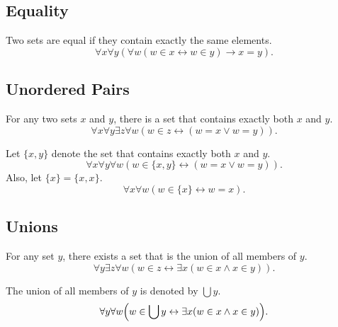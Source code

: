 \documentclass[11pt]{article}
\begin{document}
\subsection{Equality}
\begin{axiom}[Extensionality]
  Two sets are equal if they contain exactly the same elements.
  \begin{equation*}
    \forall x \forall y (\forall w (w \in x \leftrightarrow w \in y) \rightarrow x = y). 
  \end{equation*}
\end{axiom}

\subsection{Unordered Pairs}
\begin{axiom}[Pairing]
  For any two sets $x$ and $y$, there is a set that contains exactly both $x$ and $y$.
  \begin{equation*}
    \forall x \forall y \exists z \forall w (w \in z \leftrightarrow (w = x \vee w = y)).
  \end{equation*}
\end{axiom}

\begin{definition}
  Let $\{x, y\}$ denote the set that contains exactly both $x$ and $y$.
  \begin{equation*}
    \forall x \forall y \forall w (w \in \{x, y\} \leftrightarrow (w = x \vee w = y)).
  \end{equation*}
  Also, let $\{x\} = \{x, x\}$.
  \begin{equation*}
    \forall x \forall w (w \in \{x\} \leftrightarrow w = x).
  \end{equation*}
\end{definition}

\subsection{Unions}
\begin{axiom}[Union]
  For any set $y$, there exists a set that is the union of all members of $y$.
  \begin{equation*}
    \forall y \exists z \forall w (w \in z \leftrightarrow \exists x (w \in x \wedge x \in y)).
  \end{equation*}
\end{axiom}

\begin{definition}
  The union of all members of $y$ is denoted by $\bigcup y$.
  \begin{equation*}
    \forall y \forall w \Bigl(w \in \bigcup y \leftrightarrow \exists x (w \in x \wedge x \in y)\Bigr).
  \end{equation*}
\end{definition}
\end{document}

